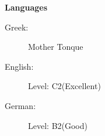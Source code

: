 \documentclass[letterpaper,11pt]{article}
\newcommand{\resheading}[1]{{\large \colorbox{mygrey}{\begin{minipage}{\textwidth}{\textbf{#1 \vphantom{p\^{E}}}}\end{minipage}}}}
\begin{document}
\resheading{Languages}
\begin{description}
	\item[Greek:] Mother Tonque 
	\item[English:] Level: C2(Excellent)
	\item[German:] Level: B2(Good)
\end{description}
\end{document}
